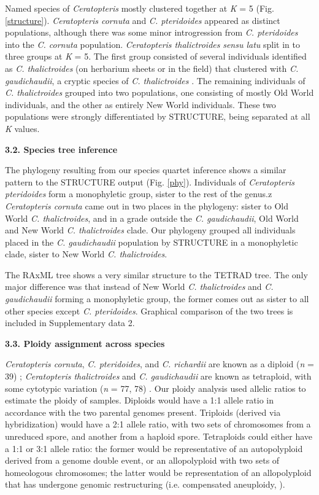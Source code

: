\documentclass[12pt]{article}
\begin{document}
\begin{flushleft}
Named species of \textit{Ceratopteris} mostly clustered together at \textit{K} = 5 (Fig. \ref{structure}). \textit{Ceratopteris cornuta} and \textit{C. pteridoides} appeared as distinct populations, although there was some minor introgression from \textit{C. pteridoides} into the \textit{C. cornuta} population. \textit{Ceratopteris thalictroides} \textit{sensu latu} split in to three groups at \textit{K} = 5. The first group consisted of several individuals identified as \textit{C. thalictroides} (on herbarium sheets or in the field) that clustered with \textit{C. gaudichaudii}, a cryptic species of \textit{C. thalictroides} \autocite{Masuyama2010}. The remaining individuals of \textit{C. thalictroides} grouped into two populations, one consisting of mostly Old World individuals, and the other as entirely New World individuals. These two populations were strongly differentiated by {\small{STRUCTURE}}, being separated at all \textit{K} values.

\textbf{3.2. Species tree inference}

 The phylogeny resulting from our species quartet inference shows a similar pattern to the {\small{STRUCTURE}} output (Fig. \ref{phy}). Individuals of \textit{Ceratopteris pteridoides} form a monophyletic group, sister to the rest of the genus.z \textit{Ceratopteris cornuta} came out in two places in the phylogeny: sister to Old World \textit{C. thalictroides}, and in a grade outside the \textit{C. gaudichaudii}, Old World and New World \textit{C. thalictroides} clade. Our phylogeny grouped all individuals placed in the \textit{C. gaudichaudii} population by {\small{STRUCTURE}} in a monophyletic clade, sister to New World \textit{C. thalictroides}. 
 
 The {\small{RAxML}} tree shows a very similar structure to the {\small{TETRAD}} tree. The only major difference was that instead of New World \textit{C. thalictroides} and \textit{C. gaudichaudii} forming a monophyletic group, the former comes out as sister to all other species except \textit{C. pteridoides}. Graphical comparison of the two trees is included in Supplementary data 2.  

\textbf{3.3. Ploidy assignment across species}

\textit{Ceratopteris cornuta}, \textit{C. pteridoides}, and \textit{C. richardii} are known as a diploid (\textit{n} = 39) \autocite{Adjie2007, Hickok1977}; \textit{Ceratopteris thalictroides} and \textit{C. gaudichaudii} are known as tetraploid, with some cytotypic variation (\textit{n} = 77, 78) \autocite{Adjie2007, Masuyama2010}. Our ploidy analysis used allelic ratios to estimate the ploidy of samples. Diploids would have a 1:1 allele ratio in accordance with the two parental genomes present. Triploids (derived via hybridization) would have a 2:1 allele ratio, with two sets of chromosomes from a unreduced spore, and another from a haploid spore. Tetraploids could either have a 1:1 or 3:1 allele ratio: the former would be representative of an autopolyploid derived from a genome double event, or an allopolyploid with two sets of homeologous chromosomes; the latter would be representation of an allopolyploid that has undergone genomic restructuring  (i.e. compensated aneuploidy, \cite{Sigel2016}). 


\end{flushleft}
\end{document}
